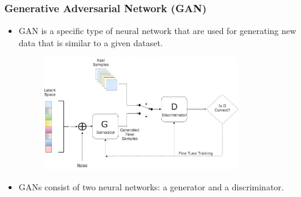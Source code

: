 \begin{frame}
\frametitle{Generative Adversarial Network (GAN)}
\begin{itemize}
\item GAN is a specific type of neural network that are used for generating new data that is similar to a given dataset.
\begin{figure}[h]
\centering
\includegraphics[width=0.8\textwidth]{figures/gan.jpeg}
\end{figure}
\item GANs consist of two neural networks: a generator and a discriminator.
\end{itemize}
\end{frame}
